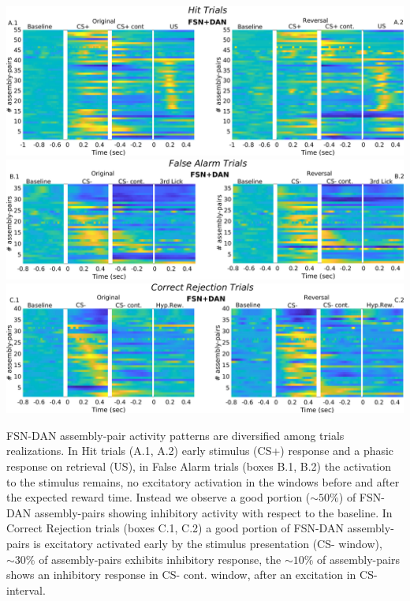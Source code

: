  \begin{largefigure}[16pt]
 \centering
 \includegraphics[scale=0.27]{figures/HeatFSN_DANHit.png} \includegraphics[scale=0.27]{figures/HeatFA_FSN_DAN1.png}
 \includegraphics[scale=0.27]{figures/HeatCR_FSN_DAN1.png}
  \caption{FSN-DAN assembly-pair activity patterns are diversified among trials realizations. In Hit trials (A.1, A.2) early stimulus (CS+) response and a phasic response on retrieval (US), in False Alarm trials (boxes B.1, B.2) the activation to the stimulus remains, no excitatory activation in the windows before and after the expected reward time. Instead we observe a good portion ($\sim50\%$) of FSN-DAN assembly-pairs showing inhibitory activity with respect to the baseline. In Correct Rejection trials (boxes C.1, C.2) a good portion of FSN-DAN assembly-pairs is excitatory activated early by the stimulus presentation (CS- window), $\sim30\%$ of assembly-pairs exhibits inhibitory response, the $\sim10\%$ of assembly-pairs shows an inhibitory response in CS- cont. window, after an excitation in CS- interval.}
  \label{fig:HeatFSN_DANComp}
\end{largefigure}
